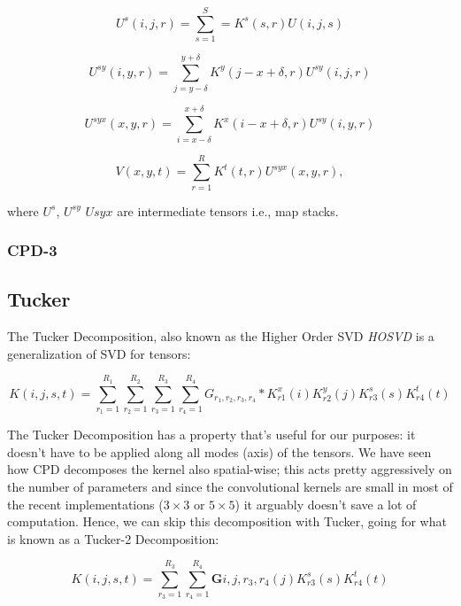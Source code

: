 \begin{equation}
\label{eq:cpd1}
    U^s(i,j,r) =\sum^{S}_{s=1}=K^s(s,r)U(i,j,s)    
\end{equation}

\begin{equation}
    U^{sy}(i,y,r) = \sum_{j=y-\delta}^{y+\delta} K^y (j-x + \delta,r)U^{sy}(i,j,r)
\end{equation}

\begin{equation}
    U^{syx}(x,y,r) = \sum_{i=x-\delta}^{x+\delta} K^x (i-x + \delta,r)U^{sy}(i,y,r)
\end{equation}

\begin{equation}
\label{eq:cpd2}
    V(x,y,t) = \sum_{r=1}^R K^t (t,r) U^{syx}(x,y,r),
\end{equation}

where $U^s$, $U^{sy}$ $U{syx}$ are intermediate tensors i.e., map stacks. 

\subsubsection{CPD-3}


\subsection{Tucker}
The Tucker Decomposition, also known as the Higher Order SVD  \emph{HOSVD} is a generalization of SVD for tensors: 

$$ K(i, j, s, t) = \sum_{r_1=1}^{R_1}\sum_{r_2=1}^{R_2}\sum_{r_3=1}^{R_3}\sum_{r_4=1}^{R_4}G_{r_1, r_2, r_3, r_4} * K^x_{r1}(i)K^y_{r2}(j)K^s_{r3}(s)K^t_{r4}(t) $$

The Tucker Decomposition has a property that's useful for our purposes: it doesn't have to be applied along all modes (axis) of the tensors. We have seen how CPD decomposes the kernel also spatial-wise; this acts
pretty aggressively on the number of parameters and since the convolutional kernels are small in most of the recent implementations ($3 \times 3$ or $5 \times 5$) it arguably doesn't save a lot of computation. Hence, we can skip
this decomposition with Tucker, going for what is known as a Tucker-2 Decomposition: 

\begin{equation}
\label{eq:tucker-def}
	K(i, j, s, t) = \sum_{r_3=1}^{R_3}\sum_{r_4=1}^{R_4} \textbf{G} {i,j,r_3, r_4}(j)K^s_{r3}(s)K^t_{r4}(t) 
\end{equation} 

